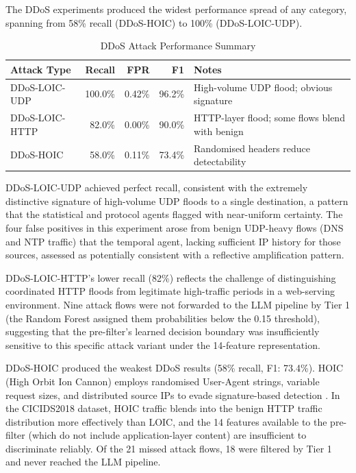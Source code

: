 \documentclass[../main.tex]{subfiles}
\begin{document}
The DDoS experiments produced the widest performance spread of any category, spanning from 58\% recall (DDoS-HOIC) to 100\% (DDoS-LOIC-UDP).

\begin{table}[H]
\centering
\caption{DDoS Attack Performance Summary}
\label{tab:ddos-performance}
\begin{tabularx}{\textwidth}{l r r r X}
\toprule
Attack Type & Recall & FPR & F1 & Notes \\
\midrule
DDoS-LOIC-UDP & 100.0\% & 0.42\% & 96.2\% & High-volume UDP flood; obvious signature \\
DDoS-LOIC-HTTP & 82.0\% & 0.00\% & 90.0\% & HTTP-layer flood; some flows blend with benign \\
DDoS-HOIC & 58.0\% & 0.11\% & 73.4\% & Randomised headers reduce detectability \\
\bottomrule
\end{tabularx}
\end{table}

DDoS-LOIC-UDP achieved perfect recall, consistent with the extremely distinctive signature of high-volume UDP floods to a single destination, a pattern that the statistical and protocol agents flagged with near-uniform certainty. The four false positives in this experiment arose from benign UDP-heavy flows (DNS and NTP traffic) that the temporal agent, lacking sufficient IP history for those sources, assessed as potentially consistent with a reflective amplification pattern.

DDoS-LOIC-HTTP's lower recall (82\%) reflects the challenge of distinguishing coordinated HTTP floods from legitimate high-traffic periods in a web-serving environment. Nine attack flows were not forwarded to the LLM pipeline by Tier 1 (the Random Forest assigned them probabilities below the 0.15 threshold), suggesting that the pre-filter's learned decision boundary was insufficiently sensitive to this specific attack variant under the 14-feature representation.

DDoS-HOIC produced the weakest DDoS results (58\% recall, F1: 73.4\%). HOIC (High Orbit Ion Cannon) employs randomised User-Agent strings, variable request sizes, and distributed source IPs to evade signature-based detection \autocite{Razak2017}. In the CICIDS2018 dataset, HOIC traffic blends into the benign HTTP traffic distribution more effectively than LOIC, and the 14 features available to the pre-filter (which do not include application-layer content) are insufficient to discriminate reliably. Of the 21 missed attack flows, 18 were filtered by Tier 1 and never reached the LLM pipeline.
\end{document}
